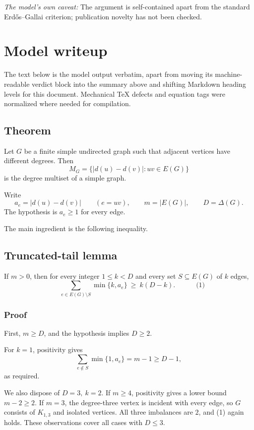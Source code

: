 \documentclass[
  11pt,
  a4paper,
]{article}
\begin{document}
\emph{The model's own caveat:} The argument is self-contained apart from
the standard Erdős--Gallai criterion; publication novelty has not been
checked.

\section{Model writeup}\label{model-writeup}

The text below is the model output verbatim, apart from moving its
machine-readable verdict block into the summary above and shifting
Markdown heading levels for this document. Mechanical TeX defects and
equation tags were normalized where needed for compilation.

\subsection{Theorem}\label{theorem}

Let \(G\) be a finite simple undirected graph such that adjacent
vertices have different degrees. Then \[
M_G=\bigl\{|d(u)-d(v)|:uv\in E(G)\bigr\}
\] is the degree multiset of a simple graph.

Write \[
a_e=|d(u)-d(v)|\qquad(e=uv),\qquad
m=|E(G)|,\qquad D=\Delta(G).
\] The hypothesis is \(a_e\ge 1\) for every edge.

The main ingredient is the following inequality.

\subsection{Truncated-tail lemma}\label{truncated-tail-lemma}

If \(m>0\), then for every integer \(1\le k<D\) and every set
\(S\subseteq E(G)\) of \(k\) edges, \[
\boxed{\quad
\sum_{e\in E(G)\setminus S}\min\{k,a_e\}\ \ge\ k(D-k).
\quad} \qquad\text{(1)}
\]

\subsubsection{Proof}\label{proof}

First, \(m\ge D\), and the hypothesis implies \(D\ge2\).

For \(k=1\), positivity gives \[
\sum_{e\notin S}\min\{1,a_e\}=m-1\ge D-1,
\] as required.

We also dispose of \(D=3,\ k=2\). If \(m\ge4\), positivity gives a lower
bound \(m-2\ge2\). If \(m=3\), the degree-three vertex is incident with
every edge, so \(G\) consists of \(K_{1,3}\) and isolated vertices. All
three imbalances are \(2\), and (1) again holds. These observations
cover all cases with \(D\le3\).
\end{document}
